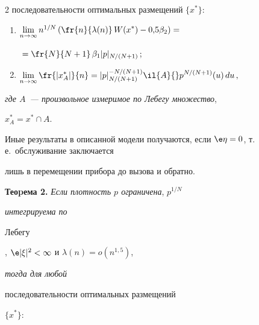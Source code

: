 \begin{multicols}{2}
{последовательности оптимальных размещений} $\{x^*\}:$


\begin{enumerate}[(1)]






\item $\liml{n\rightarrow


\infty}n^{1/N}\left(\displaystyle\fr{n}{\lambda(n)}\, W(x^*)-0{,}5\beta_2\right)={}$





\noindent


\hfill${}=\displaystyle


\fr{N}{N+1}\,\beta_1 |p|_{N/(N+1)}\,;$\\


\item


$\liml{n\rightarrow\infty}\displaystyle\fr{\left|x_A^*\right|}{n}=|p|_{N/(N+1)}^{-N/(N+1)}\il{A}{}p^{N/(N+1)}(u)\,du\,,$






\end{enumerate}


{\it где $A$~--- произвольное измеримое по Лебегу множество},\


$x_A^*=x^*\cap A$.





\smallskip


Иные результаты в описанной модели получаются, если $\e \eta=0$, т.\,е.\ обслуживание заключается


лишь в перемещении прибора до вызова и обратно.





\smallskip





\noindent


\textbf{Теоpема 2.} {\it Если плотность $p$ ограничена}, $p^{1/N}$ {\it интегрируема по


Лебегу}, ${\e}|\xi|^2<\infty$ и $\lambda(n)= o(n^{1{,}5})$, {\it тогда для любой


последовательности оптимальных размещений} $\{x^*\}$:



\end{multicols}
